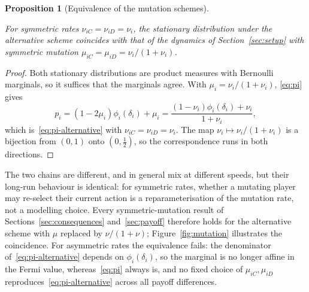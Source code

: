 \documentclass[11pt]{article}
\newtheorem{proposition}{Proposition}
\begin{document}
\begin{proposition}[Equivalence of the mutation schemes]\label{prop:equivalence}

For symmetric rates \(\nu_{iC}=\nu_{iD}=\nu_i\), the stationary distribution
under the alternative scheme coincides with that of the dynamics of
Section~\ref{sec:setup} with symmetric mutation
\(\mu_{iC}=\mu_{iD}=\nu_i/(1+\nu_i)\).

\end{proposition}

\begin{proof}

Both stationary distributions are product measures with Bernoulli marginals,
so it suffices that the marginals agree. With \(\mu_i=\nu_i/(1+\nu_i)\),
\eqref{eq:pi} gives
\[
  p_i = (1-2\mu_i)\phi_i(\delta_i)+\mu_i
      = \frac{(1-\nu_i)\phi_i(\delta_i)+\nu_i}{1+\nu_i},
\]
which is~\eqref{eq:pi-alternative} with \(\nu_{iC}=\nu_{iD}=\nu_i\). The map
\(\nu_i\mapsto\nu_i/(1+\nu_i)\) is a bijection from \((0,1)\) onto
\((0,\tfrac{1}{2})\), so the correspondence runs in both directions.

\end{proof}

The two chains are different, and in general mix at different speeds, but
their long-run behaviour is identical: for symmetric rates, whether a
mutating player may re-select their current action is a reparameterisation
of the mutation rate, not a modelling choice. Every symmetric-mutation
result of Sections~\ref{sec:consequences} and~\ref{sec:payoff} therefore
holds for the alternative scheme with \(\mu\) replaced by \(\nu/(1+\nu)\);
Figure~\ref{fig:mutation} illustrates the coincidence. For asymmetric rates
the equivalence fails: the denominator of~\eqref{eq:pi-alternative} depends
on \(\phi_i(\delta_i)\), so the marginal is no longer affine in the Fermi
value, whereas~\eqref{eq:pi} always is, and no fixed choice of
\(\mu_{iC},\mu_{iD}\) reproduces~\eqref{eq:pi-alternative} across all payoff
differences.
\end{document}
